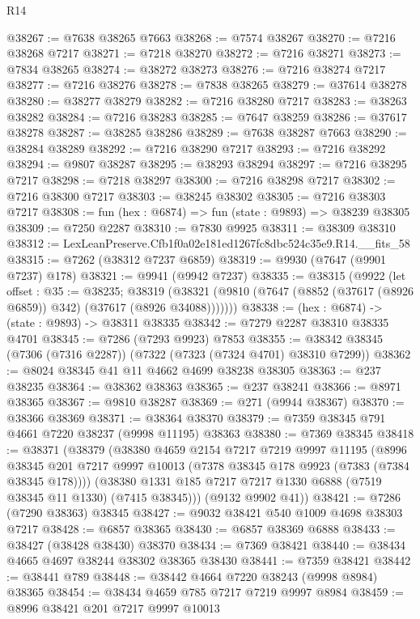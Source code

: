 \begin{lexlean}{R14}
\begin{coremodule}
@38267 := @7638 @38265 @7663
@38268 := @7574 @38267
@38270 := @7216 @38268 @7217
@38271 := @7218 @38270
@38272 := @7216 @38271
@38273 := @7834 @38265
@38274 := @38272 @38273
@38276 := @7216 @38274 @7217
@38277 := @7216 @38276
@38278 := @7838 @38265
@38279 := @37614 @38278
@38280 := @38277 @38279
@38282 := @7216 @38280 @7217
@38283 := @38263 @38282
@38284 := @7216 @38283
@38285 := @7647 @38259
@38286 := @37617 @38278
@38287 := @38285 @38286
@38289 := @7638 @38287 @7663
@38290 := @38284 @38289
@38292 := @7216 @38290 @7217
@38293 := @7216 @38292
@38294 := @9807 @38287
@38295 := @38293 @38294
@38297 := @7216 @38295 @7217
@38298 := @7218 @38297
@38300 := @7216 @38298 @7217
@38302 := @7216 @38300 @7217
@38303 := @38245 @38302
@38305 := @7216 @38303 @7217
@38308 := fun (hex : @6874) => fun (state : @9893) => @38239 @38305
@38309 := @7250 @2287
@38310 := @7830 @9925
@38311 := @38309 @38310
@38312 := LexLeanPreserve.Cfb1f0a02e181ed1267fc8dbc524c35e9.R14.__fits_58
@38315 := @7262 (@38312 @7237 @6859)
@38319 := @9930 (@7647 (@9901 @7237) @178)
@38321 := @9941 (@9942 @7237)
@38335 := @38315
    (@9922
      (let offset : @35 := @38235;
      @38319 (@38321 (@9810 (@7647 (@8852 (@37617 (@8926 @6859)) @342) (@37617 (@8926 @34088)))))))
@38338 := (hex : @6874) -> (state : @9893) -> @38311 @38335
@38342 := @7279 @2287 @38310 @38335 @4701
@38345 := @7286 (@7293 @9923) @7853
@38355 := @38342 @38345 (@7306 (@7316 @2287)) (@7322 (@7323 (@7324 @4701) @38310 @7299))
@38362 := @8024 @38345 @41 @11 @4662 @4699 @38238 @38305
@38363 := @237 @38235
@38364 := @38362 @38363
@38365 := @237 @38241
@38366 := @8971 @38365
@38367 := @9810 @38287
@38369 := @271 (@9944 @38367)
@38370 := @38366 @38369
@38371 := @38364 @38370
@38379 := @7359 @38345 @791 @4661 @7220 @38237 (@9998 @11195) @38363
@38380 := @7369 @38345
@38418 := @38371
    (@38379
      (@38380
        @4659
        @2154
        @7217
        @7219
        @9997
        @11195
        (@8996 @38345 @201 @7217 @9997 @10013 (@7378 @38345 @178 @9923 (@7383 (@7384 @38345 @178))))
        (@38380 @1331 @185 @7217 @7217 @1330 @6888 (@7519 @38345 @11 @1330) (@7415 @38345)))
      (@9132 @9902 @41))
@38421 := @7286 (@7290 @38363) @38345
@38427 := @9032 @38421 @540 @1009 @4698 @38303 @7217
@38428 := @6857 @38365
@38430 := @6857 @38369 @6888
@38433 := @38427 (@38428 @38430) @38370
@38434 := @7369 @38421
@38440 := @38434 @4665 @4697 @38244 @38302 @38365 @38430
@38441 := @7359 @38421
@38442 := @38441 @789
@38448 := @38442 @4664 @7220 @38243 (@9998 @8984) @38365
@38454 := @38434 @4659 @785 @7217 @7219 @9997 @8984
@38459 := @8996 @38421 @201 @7217 @9997 @10013

\end{coremodule}
\end{lexlean}

